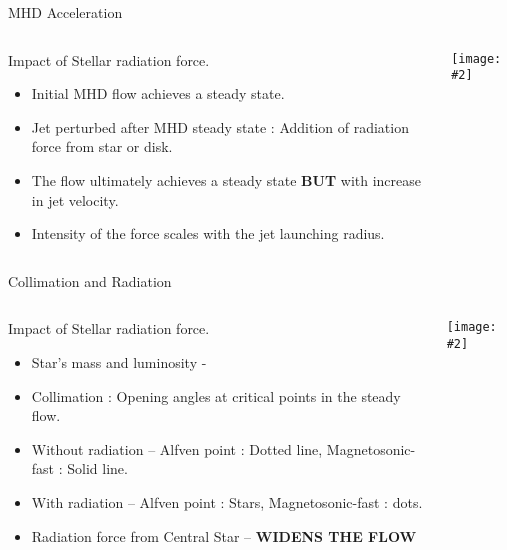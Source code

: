 \documentclass[8pt,xcolor=dvipsnames]{beamer}
\newcommand{\jlfigpath}{/Users/bhargavvaidya/THESIS/chapter3/figures/}
\newcommand{\spic}[2]{\texttt{[image: \#2]}}
\newcommand{\myref}[1]{{\small{\color{red}{(#1)}}}}
\begin{document}
\begin{frame}{MHD Acceleration}
\begin{columns}
\begin{column}{0.4\textwidth}
\begin{block}{Impact of Stellar radiation force.}
\begin{itemize}
\item Initial MHD flow achieves a steady state.
\item Jet perturbed after MHD steady state : Addition of radiation force from star or disk. 
\item The flow ultimately achieves a steady state \textbf{BUT} with increase in
  jet velocity.
\item Intensity of the force scales with the jet launching radius. 
\end{itemize}
\end{block}
\end{column}
\begin{column}{0.6\textwidth}
\spic{0.23}{\jlfigpath/f6_col.pdf}
\end{column}
\end{columns}
\end{frame}

\begin{frame}{Collimation and Radiation \myref{Vaidya et. al. 2011}}
\begin{columns}
\begin{column}{0.4\textwidth}
\begin{block}{Impact of Stellar radiation force.}
\begin{itemize}
\item Star's mass and luminosity - \myref{Hosokawa 2008}
\item Collimation : Opening angles at critical points in the steady
  flow.
\item Without radiation -- Alfven point : Dotted line,
  Magnetosonic-fast : Solid line.
\item With radiation -- Alfven point : Stars, Magnetosonic-fast : dots.
\item Radiation force from Central Star -- \textbf{WIDENS THE FLOW}
\end{itemize}
\end{block}
\end{column}
\begin{column}{0.6\textwidth}
\spic{0.23}{\jlfigpath/f11.pdf}
\end{column}
\end{columns}
\end{frame}
\end{document}
